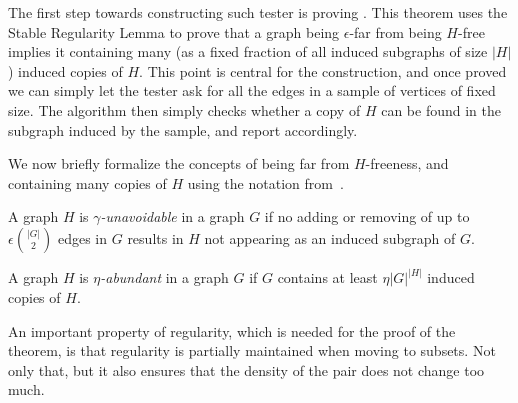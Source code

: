     The first step towards constructing such tester is proving .
    This theorem uses the Stable Regularity Lemma to prove that a graph being $\epsilon$-far
    from being $H$-free implies it containing many (as a fixed fraction of all induced subgraphs of size $|H|$)
    induced copies of $H$.
    This point is central for the construction, and once proved we can simply let the tester ask for all the edges
    in a sample of vertices of fixed size.
    The algorithm then simply checks whether a copy of $H$ can be found in the subgraph induced by the sample, and report
    accordingly.

    We now briefly formalize the concepts of being far from $H$-freeness, and containing many copies of $H$ using the
    notation from~\cite{efficient_testing_of_large_graphs}.

    \begin{definition} \label{def:unavoidable}
        A graph $H$ is \emph{$\gamma$-unavoidable} in a graph $G$ if no adding or removing of up to $\epsilon {|G| \choose 2}$
        edges in $G$ results in $H$ not appearing as an induced subgraph of $G$.
    \end{definition}

    \begin{definition} \label{def:abundant}
        A graph $H$ is \emph{$\eta$-abundant} in a graph $G$ if $G$ contains at least $\eta |G|^{|H|}$
        induced copies of $H$.
    \end{definition}

    An important property of regularity, which is needed for the proof of the theorem, is that regularity is
    partially maintained when moving to subsets.
    Not only that, but it also ensures that the density of the pair does not change too much.


